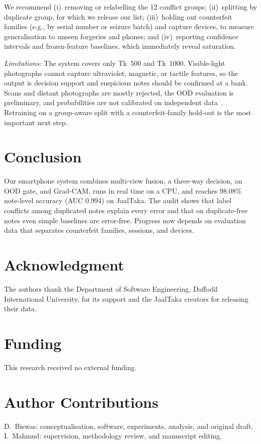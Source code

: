 \documentclass[journal]{IEEEtran}
\begin{document}
We recommend (i)~removing or relabelling the 12 conflict groups; (ii)~splitting by
duplicate group, for which we release our list; (iii)~holding out counterfeit families
(e.g., by serial number or seizure batch) and capture devices, to measure generalisation
to unseen forgeries and phones; and (iv)~reporting confidence intervals and
frozen-feature baselines, which immediately reveal saturation.

\textit{Limitations:} The system covers only Tk~500 and Tk~1000. Visible-light
photographs cannot capture ultraviolet, magnetic, or tactile features, so the output is
decision support and suspicious notes should be confirmed at a bank. Scans and distant
photographs are mostly rejected, the OOD evaluation is preliminary, and probabilities
are not calibrated on independent data~\cite{guo2017calibration}. Retraining on a
group-aware split with a counterfeit-family hold-out is the most important next step.

\section{Conclusion}
\label{sec:conclusion}

Our smartphone system combines multi-view fusion, a three-way decision, an OOD gate, and
Grad-CAM, runs in real time on a CPU, and reaches 98.08\% note-level accuracy (AUC 0.994)
on JaalTaka. The audit shows that label conflicts among duplicated notes explain every
error and that on duplicate-free notes even simple baselines are error-free. Progress now
depends on evaluation data that separates counterfeit families, sessions, and devices.

\section*{Acknowledgment}
The authors thank the Department of Software Engineering, Daffodil International
University, for its support and the JaalTaka creators for releasing their data.

\section*{Funding}
This research received no external funding.

\section*{Author Contributions}
D.~Biswas: conceptualisation, software, experiments, analysis, and original draft.
I.~Mahmud: supervision, methodology review, and manuscript editing.
\end{document}
